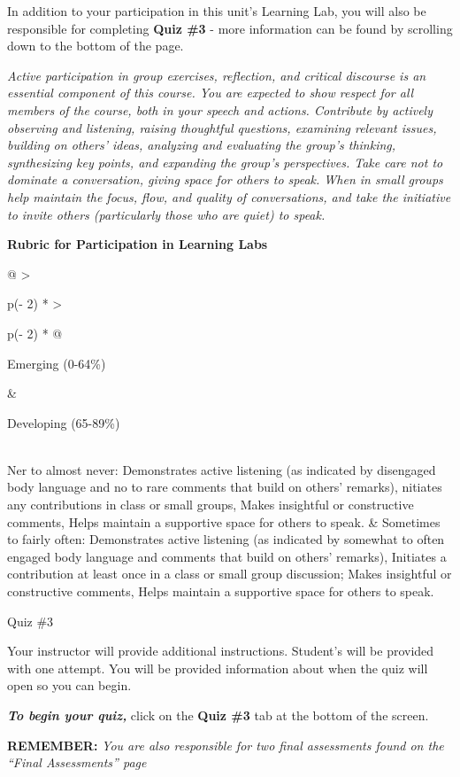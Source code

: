 \documentclass[
]{book}
\begin{document}
\begin{assessment}
In addition to your participation in this unit's Learning Lab, you will also be responsible for completing \textbf{Quiz \#3} - more information can be found by scrolling down to the bottom of the page.

\emph{Active participation in group exercises, reflection, and critical discourse is an essential component of this course. You are expected to show respect for all members of the course, both in your speech and actions. Contribute by actively observing and listening, raising thoughtful questions, examining relevant issues, building on others' ideas, analyzing and evaluating the group's thinking, synthesizing key points, and expanding the group's perspectives. Take care not to dominate a conversation, giving space for others to speak. When in small groups help maintain the focus, flow, and quality of conversations, and take the initiative to invite others (particularly those who are quiet) to speak.}

\textbf{Rubric for Participation in Learning Labs}

\begin{longtable}[]{@{}
  >{\raggedright\arraybackslash}p{(\columnwidth - 2\tabcolsep) * }
  >{\raggedright\arraybackslash}p{(\columnwidth - 2\tabcolsep) * }@{}}
\toprule\noalign{}
\begin{minipage}[b]{\linewidth}\raggedright
Emerging (0-64\%)
\end{minipage} & \begin{minipage}[b]{\linewidth}\raggedright
Developing (65-89\%)
\end{minipage} \\
\midrule\noalign{}
\endhead
\bottomrule\noalign{}
\endlastfoot
Ner to almost never: Demonstrates active listening (as indicated by disengaged body language and no to rare comments that build on others' remarks), nitiates any contributions in class or small groups, Makes insightful or constructive comments, Helps maintain a supportive space for others to speak. & Sometimes to fairly often: Demonstrates active listening (as indicated by somewhat to often engaged body language and comments that build on others' remarks), Initiates a contribution at least once in a class or small group discussion; Makes insightful or constructive comments, Helps maintain a supportive space for others to speak. \\
\end{longtable}

{Quiz \#3}

Your instructor will provide additional instructions. Student's will be provided with one attempt. You will be provided information about when the quiz will open so you can begin.

\textbf{\emph{To begin your quiz,}} click on the \textbf{Quiz \#3} tab at the bottom of the screen.

\textbf{REMEMBER:} \emph{You are also responsible for two final assessments found on the ``Final Assessments'' page}
\end{assessment}
\end{document}
